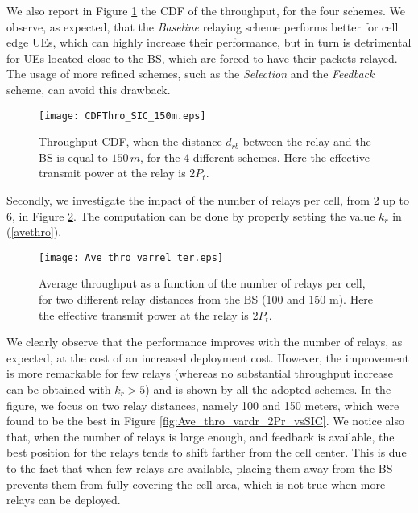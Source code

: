 \documentclass[12pt, letterpaper, onecolumn, draftcls]{IEEEtran}
\newcommand{\figw}{0.55\columnwidth}
\begin{document}
We also report in Figure \ref{fig:CDFThro_SIC_150m} the CDF of the throughput, for the four schemes. We observe, as expected, that the \textit{Baseline} relaying scheme performs better for cell edge UEs, which can highly increase their performance, but in turn is detrimental for UEs located close to the BS, which are forced to have their packets relayed. The usage of more refined schemes, such as the \textit{Selection} and the \textit{Feedback} scheme, can avoid this drawback.
\begin{figure}
    \centering
    \texttt{[image: CDFThro\_SIC\_150m.eps]}
    \vspace{-0.5cm}
     \caption{\small Throughput CDF, when the distance $d_{rb}$ between the relay and the BS is equal to $150\,m$, for the 4 different schemes. Here the effective transmit power at the relay is $2P_t$.}
\label{fig:CDFThro_SIC_150m}
\end{figure}

Secondly, we investigate the impact of the number of relays per cell, from 2 up to 6, in Figure \ref{fig:Ave_thro_varrel}. The computation can be done by properly setting the value $k_r$ in (\ref{avethro}).
\begin{figure}
    \centering
    \texttt{[image: Ave\_thro\_varrel\_ter.eps]}
    \vspace{-0.5cm}
     \caption{\small Average throughput as a function of the number of relays per cell, for two different relay distances from the BS (100 and 150 m). Here the effective transmit power at the relay is $2P_t$.}
     \vspace{-1cm}
  \label{fig:Ave_thro_varrel}
\end{figure}
We clearly observe that the performance improves with the number of relays, as expected, at the cost of an increased deployment cost.
However, the improvement is more remarkable for few relays (whereas no substantial throughput increase can be obtained with $k_r>5$) and is shown by all the adopted schemes. In the figure, we focus on two relay distances, namely 100 and 150 meters, which were found to be the best in Figure \ref{fig:Ave_thro_vardr_2Pr_vsSIC}.
We notice also that, when the number of relays is large enough, and feedback is available, the best position for the relays tends to shift farther from the cell center. This is due to the fact that when few relays are available, placing them away from the BS prevents them from fully covering the cell area, which is not true when more relays can be deployed.
\end{document}
